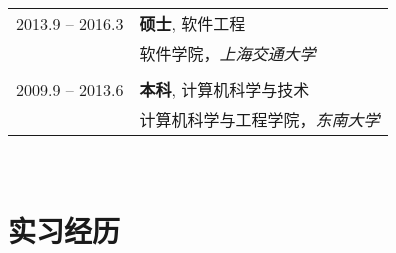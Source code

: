 \documentclass[10pt]{article} %
\begin{document}
{\begin{minipage}[t]{0.44\textwidth}
\begin{tabular}{rl} %


2013.9 -- 2016.3 & \textbf{硕士}, 软件工程 \\ 
& \textsc{软件学院}，\textit{上海交通大学}\\
&\\
	 

2009.9 -- 2013.6 & \textbf{本科}, 计算机科学与技术 \\ 
& \textsc{计算机科学与工程学院}，\textit{东南大学}\\
	 

	 

	

\end{tabular}\\[10pt]

\section{实习经历} 

\begin{tabular}{rl} %



\end{tabular}
\end{minipage}}
\end{document}
